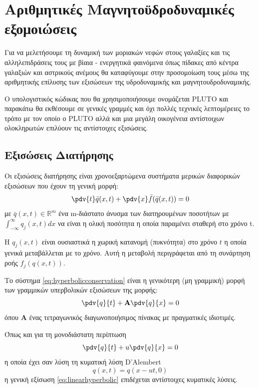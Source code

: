 \section{Αριθμητικές Μαγνητοϋδροδυναμικές εξομοιώσεις}
Για να μελετήσουμε τη δυναμική των μοριακών νεφών στους γαλαξίες και τις αλληλεπιδράσεις τους με βίαια - ενεργητικά φαινόμενα όπως πίδακες από κέντρα γαλαξιών και αστρικούς ανέμους θα καταφύγουμε στην προσομοίωση τους μέσω της αριθμητικής επίλυσης των εξισώσεων της υδροδυναμικής και μαγνητουδροδυναμικής.

Ο υπολογιστικός κώδικας που θα χρησιμοποιήσουμε ονομάζεται PLUTO \cite{mignone_pluto:_2007} και παρακάτω θα εκθέσουμε σε γενικές γραμμές και όχι πολλές τεχνικές λεπτομέρειες το τρόπο με τον οποίο ο PLUTO αλλά και μια μεγάλη οικογένεια αντίστοιχων ολοκληρωτών επιλύουν τις αντίστοιχες εξισώσεις.

\subsection{Εξισώσεις Διατήρησης}
Οι εξισώσεις διατήρησης είναι χρονοεξαρτώμενα συστήματα μερικών διαφορικών εξισώσεων που έχουν τη γενική μορφή:
\begin{equation}
\label{eq:hyperbolicconservation}
\pdv{t} \bar{q}(x,t) + \pdv{x} \bar{f}(\bar{q}(x,t)) = 0 
\end{equation}
με $\bar{q}(x,t) \in \mathbb{R}^m$ ένα m-διάστατο άνυσμα των διατηρουμένων ποσοτήτων με  $\int_{-\infty}^{\infty} q_j (x,t) dx$ να είναι η ολική ποσότητα η οποία παραμένει σταθερή στο χρόνο t. 

Η $q_j(x,t)$ είναι ουσιαστικά η χωρική κατανομή (πυκνότητα) στο χρόνο $t$ η οποία γενικά μεταβάλλεται με το χρόνο.
Αυτή η μεταβολή περιγράφεται από τη συνάρτηση ροής $f_j(q(x,t))$. 
 
Το σύστημα \ref{eq:hyperbolicconservation} είναι η γενικότερη (μη γραμμική) μορφή των γραμμικών υπερβολικών εξισώσεων της μορφής:
\begin{equation}
\label{eq:linearhyperbolic}
\pdv{q}{t} +  \mathbf{A}\pdv{q}{x}  = 0 
\end{equation}
όπου $\mathbf{A}$ ένας τετραγωνικός διαγωνοποιήσιμος πίνακας με πραγματικές ιδιοτιμές.

Όπως και για τη μονοδιάστατη  περίπτωση 
\begin{equation}
\label{eq:simple_advection}
\pdv{q}{t} +  u\pdv{q}{x}  = 0 
\end{equation}
η οποία έχει σαν λύση τη κυματική λύση D'Alembert
\begin{equation}
q(x,t)=q(x-ut,0)
\end{equation}
η γενική εξίσωση \ref{eq:linearhyperbolic} επιδέχεται αντίστοιχες κυματικές λύσεις.

